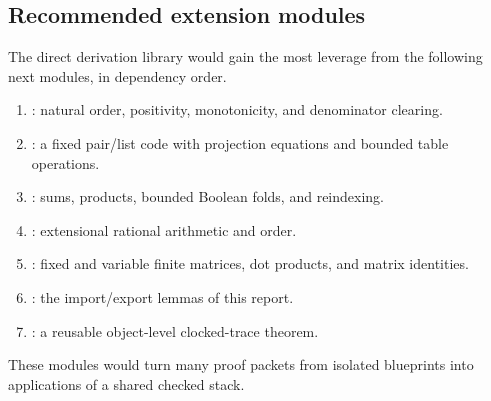 \subsection{Recommended extension modules}

The direct derivation library would gain the most leverage from the following
next modules, in dependency order.

\begin{enumerate}
\item {}: natural order, positivity, monotonicity, and denominator
clearing.
\item {}: a fixed pair/list code with projection equations and
bounded table operations.
\item {}: sums, products, bounded Boolean folds, and
reindexing.
\item {}: extensional rational arithmetic and order.
\item {}: fixed and variable finite matrices, dot products, and
matrix identities.
\item {}: the import/export lemmas of this report.
\item {}: a reusable object-level clocked-trace theorem.
\end{enumerate}

These modules would turn many proof packets from isolated blueprints into
applications of a shared checked stack.
